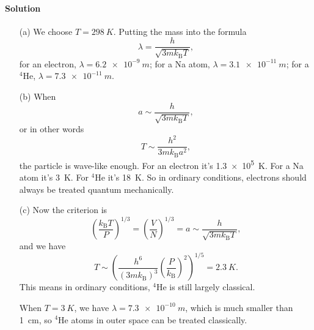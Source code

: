 \documentclass[hyperref, a4paper]{article}
\begin{document}
\paragraph{Solution} \begin{itemize}
\item[(a)] We choose $T = \SI{298}{K}$.
Putting the mass into the formula
\begin{equation}
    \lambda = \frac{h}{\sqrt{3 m k_{\text{B}} T}},
\end{equation}
for an electron, $\lambda = \SI{6.2e-9}{m}$;
for a Na atom, $\lambda = \SI{3.1e-11}{m}$;
for a $^4$He, $\lambda = \SI{7.3e-11}{m}$.
\item[(b)] When 
\begin{equation}
    a \sim \frac{h}{\sqrt{3 m k_{\text{B}} T} },
\end{equation}
or in other words 
\begin{equation}
    T \sim \frac{h^2}{3 m k_{\text{B}} a^2},
\end{equation}
the particle is wave-like enough.
For an electron it's \SI{1.3e5}{K}.
For a Na atom it's \SI{3}{K}.
For $^4$He it's \SI{18}{K}.
So in ordinary conditions, 
electrons should always be treated quantum mechanically.

\item[(c)] Now the criterion is 
\begin{equation}
    \left(\frac{k_{\text{B}} T}{P}\right)^{1/3} = \left(\frac{V}{N}\right)^{1/3} = a \sim \frac{h}{\sqrt{3 m k_{\text{B}} T} },
\end{equation}
and we have 
\begin{equation}
    T \sim \left( \frac{h^6}{(3 m k_{\text{B}})^3} \left( \frac{P}{k_{\text{B}}} \right)^2 \right)^{1/5} 
    = \SI{2.3}{K}.
\end{equation}
This means in ordinary conditions, 
$^4$He is still largely classical.

When $T = \SI{3}{K}$, we have $\lambda = \SI{7.3e-10}{m}$,
which is much smaller than \SI{1}{cm},
so $^4$He atoms in outer space can be treated classically.


\end{itemize}
\end{document}
